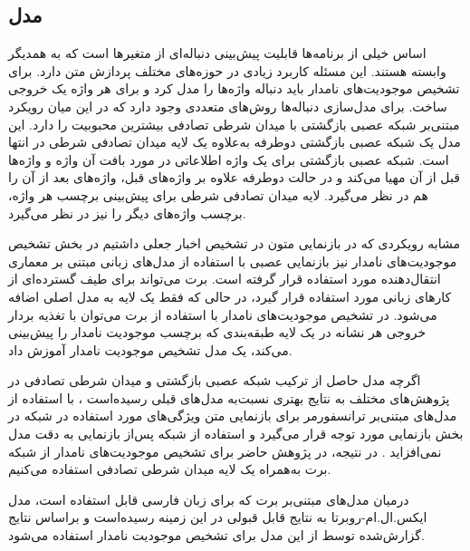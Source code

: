 \begin{table}
\begin{center}
\begin{tabular}{|P{1.2cm}|P{2cm}|P{2cm}|P{8cm}|}
		\end{tabular}
	\end{center}
\end{table}

\subsection{مدل}
اساس خیلی از برنامه‌ها قابلیت پیش‌بینی دنباله‌ای از متغیر‌ها است که به همدیگر وابسته هستند. این مسئله کاربرد زیادی در حوزه‌های مختلف پردازش متن دارد. برای تشخیص موجودیت‌های نامدار باید دنباله واژه‌ها را مدل کرد و برای هر واژه یک خروجی ساخت. برای مدل‌سازی دنباله‌ها روش‌های متعددی وجود دارد که در این میان رویکرد مبتنی‌بر شبکه عصبی بازگشتی با میدان شرطی تصادفی بیشترین محبوبیت را دارد. این مدل یک شبکه عصبی بازگشتی دوطرفه به‌‌علاوه یک لایه میدان تصادفی شرطی در انتها است. شبکه عصبی بازگشتی برای یک واژه اطلاعاتی در مورد بافت آن واژه و واژه‌ها قبل از آن مهیا می‌کند و در حالت دوطرفه علاوه بر واژه‌های قبل، واژه‌های بعد از آن را هم در نظر می‌گیرد. لایه میدان تصادفی شرطی برای پیش‌بینی برچسب هر واژه، برچسب واژه‌های دیگر را نیز در نظر می‌گیرد.

مشابه رویکردی که در بازنمایی متون در تشخیص اخبار جعلی داشتیم در بخش تشخیص موجودیت‌های نامدار نیز بازنمایی عصبی با استفاده از مدل‌های زبانی مبتنی بر معماری انتقال‌دهنده‌ مورد استفاده قرار گرفته است. برت می‌تواند برای طیف گسترده‌ای از کارهای زبانی مورد استفاده قرار گیرد‌، در حالی که فقط یک لایه به مدل اصلی اضافه می‌شود. در تشخیص موجودیت‌های نامدار‌ با استفاده از برت می‌توان با تغذیه بردار خروجی هر نشانه در یک لایه طبقه‌بندی که برچسب موجودیت نامدار را پیش‌بینی می‌کند‌، یک مدل تشخیص موجودیت نامدار آموزش داد.

اگرچه مدل حاصل از ترکیب شبکه عصبی بازگشتی و میدان شرطی تصادفی در پژوهش‌های مختلف به نتایج بهتری نسبت‌به مدل‌های قبلی رسیده‌است \citep{huang2015bidirectional}، با استفاده از مدل‌های مبتنی‌بر ترانسفورمر برای بازنمایی متن ویژگی‌های مورد استفاده در شبکه  در بخش بازنمایی مورد توجه قرار می‌گیرد و استفاده از شبکه  پس‌از بازنمایی به دقت مدل نمی‌افزاید \citep{Thesis_abdolah}. در نتیجه، در پژوهش حاضر برای تشخیص موجودیت‌های نامدار از شبکه برت به‌همراه یک لایه میدان شرطی تصادفی استفاده می‌کنیم. 

درمیان مدل‌های مبتنی‌بر برت که برای زبان فارسی قابل استفاده است، مدل ایکس.ال.ام-روبرتا به نتایج قابل قبولی در این زمینه رسیده‌است و براساس نتایج گزارش‌شده توسط \cite{Thesis_abdolah} از این مدل برای تشخیص موجودیت نامدار استفاده می‌شود.

